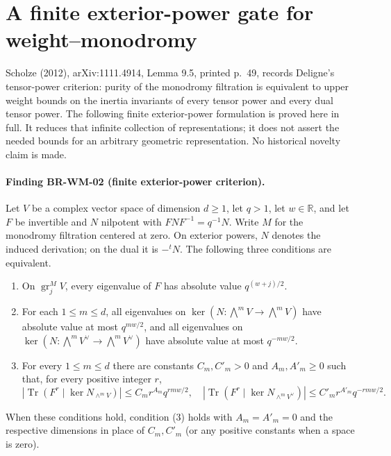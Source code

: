 \documentclass[11pt,a4paper]{article}
\theoremstyle{definition}\newtheorem{definition}[theorem]{Definition}
\theoremstyle{remark}\newtheorem{remark}[theorem]{Remark}
\begin{document}

\section{A finite exterior-power gate for weight--monodromy}
\label{sec:finite-weight-gate}

Scholze (2012), arXiv:1111.4914, Lemma 9.5, printed p.~49,
records Deligne's tensor-power criterion: purity of the monodromy
filtration is equivalent to upper weight bounds on the inertia
invariants of every tensor power and every dual tensor power.
The following finite exterior-power formulation is proved here in
full. It reduces that infinite collection of representations; it
does not assert the needed bounds for an arbitrary geometric
representation. No historical novelty claim is made.

\paragraph{Finding BR-WM-02 (finite exterior-power criterion).}
Let $V$ be a complex vector space of dimension $d\geq1$, let
$q>1$, let $w\in\mathbb R$, and let $F$ be invertible and $N$
nilpotent with $FNF^{-1}=q^{-1}N$. Write $M$ for the monodromy
filtration centered at zero. On exterior powers, $N$ denotes the
induced derivation; on the dual it is $-{}^tN$. The following
three conditions are equivalent.
\begin{enumerate}
\item On $\operatorname{gr}_j^M V$, every eigenvalue of $F$
has absolute value $q^{(w+j)/2}$.
\item For each $1\leq m\leq d$, all eigenvalues on
$\ker(N:\bigwedge^m V\to\bigwedge^m V)$ have absolute value
at most $q^{mw/2}$, and all eigenvalues on
$\ker(N:\bigwedge^m V^\vee\to\bigwedge^m V^\vee)$ have absolute
value at most $q^{-mw/2}$.
\item For every $1\leq m\leq d$ there are constants
$C_m,C'_m>0$ and $A_m,A'_m\geq0$ such that, for every
positive integer $r$,
\[
 \left|\operatorname{Tr}\left(F^r\mid
             \ker N_{\wedge^m V}\right)\right|
       \leq C_m r^{A_m}q^{rmw/2},
 \quad
 \left|\operatorname{Tr}\left(F^r\mid
             \ker N_{\wedge^m V^\vee}\right)\right|
       \leq C'_m r^{A'_m}q^{-rmw/2}.
\]
\end{enumerate}
When these conditions hold, condition (3) holds with $A_m=A'_m=0$
and the respective dimensions in place of $C_m,C'_m$ (or any
positive constants when a space is zero).
\end{document}
